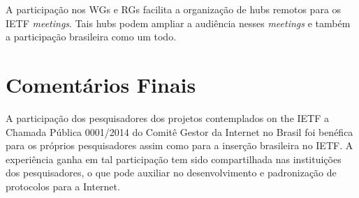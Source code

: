 \documentclass[12pt]{article}
\begin{document}


A participação nos WGs e RGs facilita a organização de hubs remotos para os IETF \textit{meetings}. Tais hubs podem ampliar a audiência nesses \textit{meetings} e também a participação brasileira como um todo.

\section{Comentários Finais}


A participação dos pesquisadores dos projetos contemplados on the IETF a Chamada Pública 0001/2014 do Comitê Gestor da Internet no Brasil foi benéfica para os próprios pesquisadores assim como para a inserção brasileira no IETF. A experiência ganha em tal participação tem sido compartilhada nas instituições dos pesquisadores, o que pode auxiliar no desenvolvimento e padronização de protocolos para a Internet.



\end{document}
